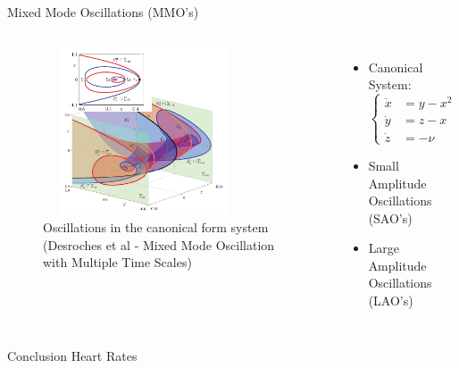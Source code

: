 \documentclass[11pt]{beamer}
\begin{document}
\begin{frame}{Mixed Mode Oscillations (MMO's)}
\begin{columns}
	\begin{figure}
		
		\includegraphics[height=5cm,width=6cm]{Images/MMO-spirals}
		\caption{Oscillations in the canonical form system (Desroches et al - Mixed Mode Oscillation with Multiple Time Scales)}
		
	\end{figure}
	\begin{itemize}
		\item Canonical System:
		\begin{equation*}
			 \begin{cases}
			\dot{x}&=y-x^2\\
			\dot{y}&=z-x\\
			\dot{z}&=-\nu
			\end{cases} 
		\end{equation*}
		\item Small Amplitude Oscillations (SAO's)
		\item Large Amplitude Oscillations (LAO's)
		
	\end{itemize}
\end{columns}
\end{frame}

\begin{frame}{Conclusion}
Heart Rates
\end{frame}
\end{document}
